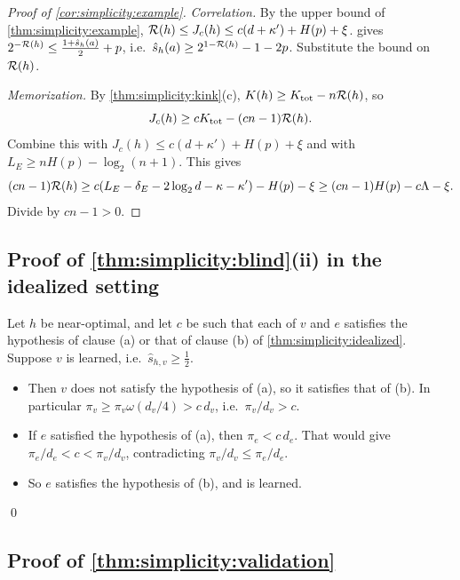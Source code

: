 \begin{proof}[Proof of \cref{cor:simplicity:example}]
\emph{Correlation.} By the upper bound of \cref{thm:simplicity:example}, $\mathcal R(h)\le J_c(h)\le c(d+\kappa')+H(p)+\xi$.  gives $2^{-\mathcal R(h)}\le\frac{1+\hat s_h(a)}2+p$, i.e.\ $\hat s_h(a)\ge2^{1-\mathcal R(h)}-1-2p$. Substitute the bound on $\mathcal R(h)$.

\emph{Memorization.} By \cref{thm:simplicity:kink}(c), $K(h)\ge K_{\rm tot}-n\mathcal R(h)$, so
\[
J_c(h)\ge cK_{\rm tot}-(cn-1)\mathcal R(h).
\]
Combine this with $J_c(h)\le c(d+\kappa')+H(p)+\xi$ and with $L_E\ge nH(p)-\log_2(n+1)$. This gives
\[
(cn-1)\mathcal R(h)\ge c(L_E-\delta_E-2\log_2d-\kappa-\kappa')-H(p)-\xi\ge(cn-1)H(p)-c\Lambda-\xi.
\]
Divide by $cn-1>0$.
\end{proof}

\subsection{Proof of \texorpdfstring{\cref{thm:simplicity:blind}}{rate blindness}(ii) in the idealized setting}\label{app:simplicity:blind}

Let $h$ be near-optimal, and let $c$ be such that each of $v$ and $e$ satisfies the hypothesis of clause (a) or that of clause (b) of \cref{thm:simplicity:idealized}. Suppose $v$ is learned, i.e.\ $\hat s_{h,v}\ge\frac12$.
\begin{itemize}
\item Then $v$ does not satisfy the hypothesis of (a), so it satisfies that of (b). In particular $\pi_v\ge\pi_v\omega(d_v/4)>c\,d_v$, i.e.\ $\pi_v/d_v>c$.
\item If $e$ satisfied the hypothesis of (a), then $\pi_e<c\,d_e$. That would give $\pi_e/d_e<c<\pi_v/d_v$, contradicting $\pi_v/d_v\le\pi_e/d_e$.
\item So $e$ satisfies the hypothesis of (b), and is learned.
\end{itemize}
\qed

\subsection{Proof of \texorpdfstring{\cref{thm:simplicity:validation}}{non-identifiability of the steepness}}\label{app:simplicity:validation}

